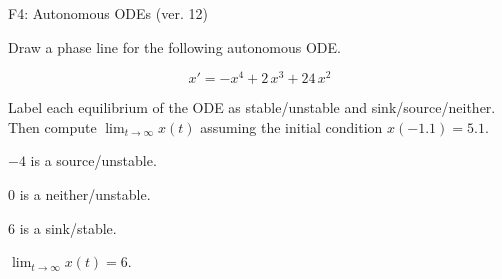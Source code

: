 \begin{exercise}
  \begin{exerciseTitle}F4: Autonomous ODEs (ver. 12)\end{exerciseTitle}
  \begin{exerciseStatement}
    

      Draw a phase line for the following 
      autonomous ODE.
    

    
\[x'= -x^{4} + 2 \, x^{3} + 24 \, x^{2}\]

    

      Label each equilibrium of the ODE
      as stable/unstable and sink/source/neither.
      Then compute \(\lim_{t\to\infty}x(t)\)
      assuming the initial condition
      \(x( -1.1 )= 5.1\).
    

  \end{exerciseStatement}
  \begin{exerciseAnswer}
    

      \(-4\) is a source/unstable.
      
        \(0\) is a neither/unstable.
      
      \(6\) is a sink/stable.
    

    

      \(\lim_{t\to\infty}x(t)=6\).
    

  \end{exerciseAnswer}
\end{exercise}